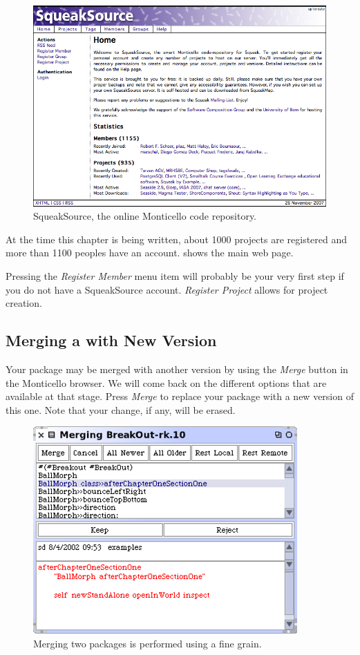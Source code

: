 \documentclass[a4paper,10pt,twoside]{book}
\begin{document}
\begin{figure}[ht]\centering
	\includegraphics[width=.75\linewidth]{squeaksource2}
	\caption{SqueakSource, the online Monticello code repository.}
\end{figure}

At the time this chapter is being written, about 1000 projects are registered and more than 1100 peoples have an account.  shows the main web page.

Pressing the \emph{Register Member} menu item will probably be your very first step if you do not have a SqueakSource account. \emph{Register Project} allows for project creation. 


\subsection{Merging a with New Version}

Your package may be merged with another version by using the \emph{Merge} button in the Monticello browser. We will come back on the different options that are available at that stage. Press \emph{Merge} to replace your package with a new version of this one. Note that your change, if any, will be erased.

\begin{figure}[ht]\centering
	\includegraphics[width=.75\linewidth]{merger}
	\caption{Merging two packages is performed using a fine grain.}
\end{figure}
\end{document}
